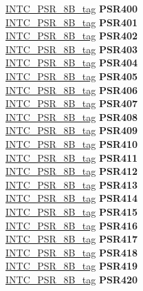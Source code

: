 \begin{DoxyCompactItemize}
\begin{tabbing}
\>\>\mbox{\hyperlink{unionINTC__PSR__8B__tag}{INTC\_PSR\_8B\_tag}} {\bfseries PSR400}\\
\>\>\mbox{\hyperlink{unionINTC__PSR__8B__tag}{INTC\_PSR\_8B\_tag}} {\bfseries PSR401}\\
\>\>\mbox{\hyperlink{unionINTC__PSR__8B__tag}{INTC\_PSR\_8B\_tag}} {\bfseries PSR402}\\
\>\>\mbox{\hyperlink{unionINTC__PSR__8B__tag}{INTC\_PSR\_8B\_tag}} {\bfseries PSR403}\\
\>\>\mbox{\hyperlink{unionINTC__PSR__8B__tag}{INTC\_PSR\_8B\_tag}} {\bfseries PSR404}\\
\>\>\mbox{\hyperlink{unionINTC__PSR__8B__tag}{INTC\_PSR\_8B\_tag}} {\bfseries PSR405}\\
\>\>\mbox{\hyperlink{unionINTC__PSR__8B__tag}{INTC\_PSR\_8B\_tag}} {\bfseries PSR406}\\
\>\>\mbox{\hyperlink{unionINTC__PSR__8B__tag}{INTC\_PSR\_8B\_tag}} {\bfseries PSR407}\\
\>\>\mbox{\hyperlink{unionINTC__PSR__8B__tag}{INTC\_PSR\_8B\_tag}} {\bfseries PSR408}\\
\>\>\mbox{\hyperlink{unionINTC__PSR__8B__tag}{INTC\_PSR\_8B\_tag}} {\bfseries PSR409}\\
\>\>\mbox{\hyperlink{unionINTC__PSR__8B__tag}{INTC\_PSR\_8B\_tag}} {\bfseries PSR410}\\
\>\>\mbox{\hyperlink{unionINTC__PSR__8B__tag}{INTC\_PSR\_8B\_tag}} {\bfseries PSR411}\\
\>\>\mbox{\hyperlink{unionINTC__PSR__8B__tag}{INTC\_PSR\_8B\_tag}} {\bfseries PSR412}\\
\>\>\mbox{\hyperlink{unionINTC__PSR__8B__tag}{INTC\_PSR\_8B\_tag}} {\bfseries PSR413}\\
\>\>\mbox{\hyperlink{unionINTC__PSR__8B__tag}{INTC\_PSR\_8B\_tag}} {\bfseries PSR414}\\
\>\>\mbox{\hyperlink{unionINTC__PSR__8B__tag}{INTC\_PSR\_8B\_tag}} {\bfseries PSR415}\\
\>\>\mbox{\hyperlink{unionINTC__PSR__8B__tag}{INTC\_PSR\_8B\_tag}} {\bfseries PSR416}\\
\>\>\mbox{\hyperlink{unionINTC__PSR__8B__tag}{INTC\_PSR\_8B\_tag}} {\bfseries PSR417}\\
\>\>\mbox{\hyperlink{unionINTC__PSR__8B__tag}{INTC\_PSR\_8B\_tag}} {\bfseries PSR418}\\
\>\>\mbox{\hyperlink{unionINTC__PSR__8B__tag}{INTC\_PSR\_8B\_tag}} {\bfseries PSR419}\\
\>\>\mbox{\hyperlink{unionINTC__PSR__8B__tag}{INTC\_PSR\_8B\_tag}} {\bfseries PSR420}\\

\end{tabbing}
\end{DoxyCompactItemize}
